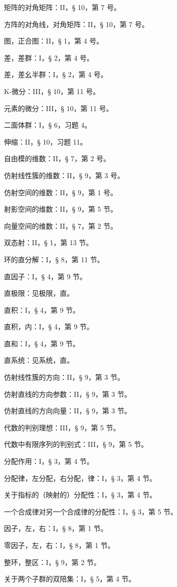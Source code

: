 矩阵的对角矩阵：II，§ 10，第 7 号。

方阵的对角线，对角矩阵：II，§ 10，第 7 号。

图，正合图：II，§ 1，第 4 号。

差，差群：I，§ 2，第 4 号。

差，差幺半群：I，§ 2，第 4 号。

K-微分：III，§ 10，第 11 号。

元素的微分：III，§ 10，第 11 号。

二面体群：I，§ 6，习题 4。

伸缩：II，§ 10，习题 11。

自由模的维数：II，§ 7，第 2 号。

仿射线性簇的维数：II，§ 9，第 3 号。

仿射空间的维数：II，§ 9，第 1 号。

射影空间的维数：II，§ 9，第 5 节。

向量空间的维数：II，§ 7，第 2 节。

双态射：II，§ 1，第 13 节。

环的直分解：I，§ 8，第 11 节。

直因子：I，§ 4，第 9 节。

直极限：见极限，直。

直积：I，§ 4，第 9 节。

直积，内：I，§ 4，第 9 节。

直和：I，§ 4，第 9 节。

直系统：见系统，直。

仿射线性簇的方向：II，§ 9，第 3 节。

仿射直线的方向参数：II，§ 9，第 3 节。

仿射直线的方向向量：II，§ 9，第 3 节。

代数的判别理想：III，§ 9，第 5 节。

代数中有限序列的判别式：III，§ 9，第 5 节。

分配作用：I，§ 3，第 4 节。

分配律，左分配，右分配，律：I，§ 3，第 4 节。

关于指标的（映射的）分配性：I，§ 3，第 4 节。

一个合成律对另一个合成律的分配性：I，§ 3，第 5 节。

因子，左，右：I，§ 8，第 1 节。

零因子，左，右：I，§ 8，第 1 节。

整环，整区：I，§ 9，第 2 节。

关于两个子群的双陪集：I，§ 5，第 4 节。

